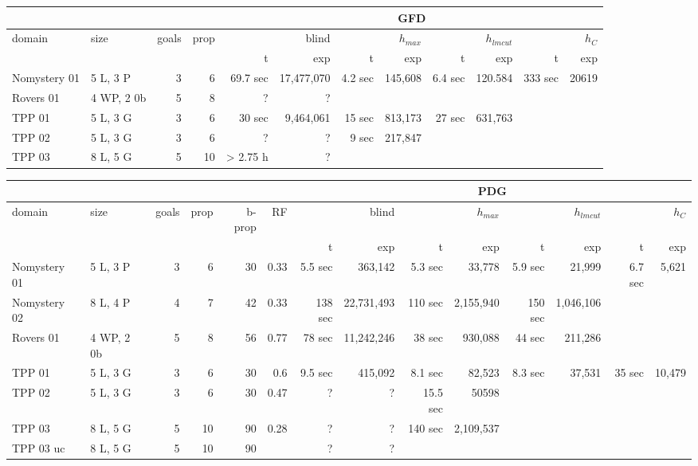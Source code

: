 \documentclass[12pt]{article}
\begin{document}
\newpage
\begin{landscape}
\scriptsize
	\begin{tabular}{l|l|r|r||rr|rr|rr|rr}
		\multicolumn{4}{c||}{}  & \multicolumn{8}{c}{GFD} \\\hline
		domain & size & goals & prop & 
			\multicolumn{2}{r|}{blind} & \multicolumn{2}{r|}{$h_{max}$} & \multicolumn{2}{r|}{$h_{lmcut}$} & \multicolumn{2}{r|}{$h_C$} \\\hline
			 &	&		&	& t & exp & t & exp & t & exp & t & exp \\\hline	
			Nomystery 01 & 5 L, 3 P & 3 & 6 & 69.7 sec & 17,477,070 & 4.2 sec & 145,608 & 6.4 sec & 120.584 & 333 sec & 20619 \\\hline
			Rovers 01 & 4 WP, 2 0b & 5 &  8 & ? & ? & \\\hline
			TPP 01 & 5 L, 3 G & 3 &  6 & 30 sec & 9,464,061 & 15 sec & 813,173 & 27 sec & 631,763 & \\\hline
			TPP 02 & 5 L, 3 G & 3 &  6 & ? & ? & 9 sec & 217,847 &\\\hline
			TPP 03 & 8 L, 5 G & 5 &  10 & > 2.75 h & ? & & &\\\hline
	\end{tabular}
	
	\vspace{1cm}	

	\begin{tabular}{l|l|r|r|r|r||rr|rr|rr|rr}
		\multicolumn{6}{c||}{} & \multicolumn{8}{c}{PDG} \\\hline
		domain & size & goals & prop & b-prop &  RF & 
			\multicolumn{2}{r|}{blind} & \multicolumn{2}{r|}{$h_{max}$} & \multicolumn{2}{r|}{$h_{lmcut}$} & \multicolumn{2}{r|}{$h_C$} \\\hline
			 &	&		&				&			&			& t & exp & t & exp & t & exp & t & exp \\\hline	
			Nomystery 01 & 5 L, 3 P & 3 & 6 & 30 & 0.33 & 5.5 sec &  363,142 & 5.3 sec & 33,778 & 5.9 sec & 21,999 & 6.7 sec & 5,621  \\\hline
			Nomystery 02 & 8 L, 4 P & 4 & 7 & 42 & 0.33 & 138 sec & 22,731,493 & 110 sec & 2,155,940 & 150 sec & 1,046,106\\\hline
			Rovers 01 & 4 WP, 2 0b & 5 &  8 & 56 & 0.77 & 78 sec & 11,242,246 & 38 sec & 930,088 & 44 sec & 211,286  \\\hline
			TPP 01 & 5 L, 3 G & 3 &  6 & 30 & 0.6 & 9.5 sec & 415,092 & 8.1 sec & 82,523 & 8.3 sec & 37,531 & 35 sec & 10,479\\\hline
			TPP 02 & 5 L, 3 G & 3 &  6 & 30 & 0.47 & ? & ? & 15.5 sec & 50598 &\\\hline
			TPP 03 & 8 L, 5 G & 5 &  10 & 90 & 0.28 & ? & ? & 140 sec & 2,109,537 &\\\hline
			TPP 03 uc & 8 L, 5 G & 5 &  10 & 90 & & ? & ? & & &\\\hline
	\end{tabular}
\end{landscape}
\end{document}
